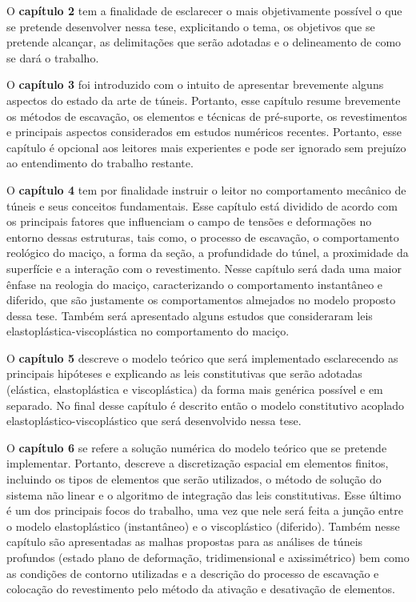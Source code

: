 O \textbf{capítulo 2} tem a finalidade de esclarecer o mais objetivamente possível o que se pretende desenvolver nessa tese, explicitando o tema, os objetivos que se pretende alcançar, as delimitações que serão adotadas e o delineamento de como se dará o trabalho.

O \textbf{capítulo 3} foi introduzido com o intuito de apresentar brevemente alguns aspectos do estado da arte de túneis. Portanto, esse capítulo resume brevemente os métodos de escavação, os elementos e técnicas de pré-suporte, os revestimentos e principais aspectos considerados em estudos numéricos recentes. Portanto, esse capítulo é opcional aos leitores mais experientes e pode ser ignorado sem prejuízo ao entendimento do trabalho restante.

O \textbf{capítulo 4} tem por finalidade instruir o leitor no comportamento mecânico de túneis e seus conceitos fundamentais. Esse capítulo está dividido de acordo com os principais fatores que influenciam o campo de tensões e deformações no entorno dessas estruturas, tais como, o processo de escavação, o comportamento reológico do maciço, a forma da seção, a profundidade do túnel, a proximidade da superfície e a interação com o revestimento. Nesse capítulo será dada uma maior ênfase na reologia do maciço, caracterizando o comportamento instantâneo e diferido, que são justamente os comportamentos almejados no modelo proposto dessa tese. Também será apresentado alguns estudos que consideraram leis elastoplástica-viscoplástica no comportamento do maciço.

O \textbf{capítulo 5} descreve o modelo teórico que será implementado esclarecendo as principais hipóteses e explicando as leis constitutivas que serão adotadas (elástica, elastoplástica e viscoplástica) da forma mais genérica possível e em separado. No final desse capítulo é descrito então o modelo constitutivo acoplado elastoplástico-viscoplástico que será desenvolvido nessa tese.

O \textbf{capítulo 6} se refere a solução numérica do modelo teórico que se pretende implementar. Portanto, descreve a discretização espacial em elementos finitos, incluindo os tipos de elementos que serão utilizados, o método de solução do sistema não linear e o algoritmo de integração das leis constitutivas. Esse último é um dos principais focos do trabalho, uma vez que nele será feita a junção entre o modelo elastoplástico (instantâneo) e o viscoplástico (diferido). Também nesse capítulo são apresentadas as malhas propostas para as análises de túneis profundos (estado plano de deformação, tridimensional e axissimétrico) bem como as condições de contorno utilizadas e a descrição do processo de escavação e colocação do revestimento pelo método da ativação e desativação de elementos.

